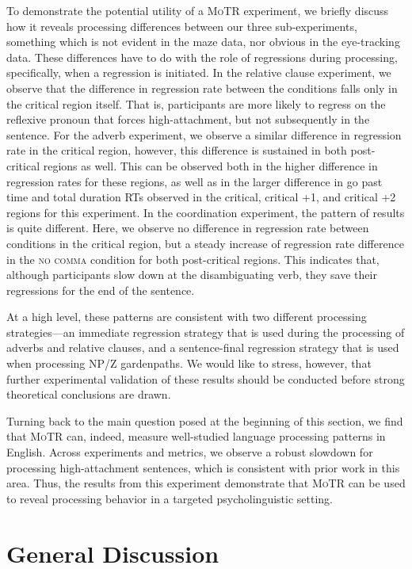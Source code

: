 \documentclass[12pt]{article}
\newcommand{\motr}{\textsc{MoTR}\xspace}
\newcommand{\nocomma}{\textsc{no comma}\xspace}
\begin{document}
{To demonstrate the potential utility of a \motr experiment, we briefly discuss how it reveals processing differences between our three sub-experiments, something which is not evident in the maze data, nor obvious in the eye-tracking data. These differences have to do with the role of regressions during processing, specifically, when a regression is initiated. In the relative clause experiment, we observe that the difference in regression rate between the conditions falls only in the critical region itself. That is, participants are more likely to regress on the reflexive pronoun that forces high-attachment, but not subsequently in the sentence. For the adverb experiment, we observe a similar difference in regression rate in the critical region, however, this difference is sustained in both post-critical regions as well. This can be observed both in the higher difference in regression rates for these regions, as well as in the larger difference in go past time and total duration RTs observed in the critical, critical +1, and critical +2 regions for this experiment. In the coordination experiment, the pattern of results is quite different. Here, we observe no difference in regression rate between conditions in the critical region, but a steady increase of regression rate difference in the \nocomma condition for both post-critical regions. This indicates that, although participants slow down at the disambiguating verb, they save their regressions for the end of the sentence. 

At a high level, these patterns are consistent with two different processing strategies---an immediate regression strategy that is used during the processing of adverbs and relative clauses, and a sentence-final regression strategy that is used when processing NP/Z gardenpaths. We would like to stress, however, that further experimental validation of these results should be conducted before strong theoretical conclusions are drawn.

Turning back to the main question posed at the beginning of this section, we find that \motr can, indeed, measure well-studied language processing patterns in English. Across experiments and metrics, we observe a robust slowdown for processing high-attachment sentences, which is consistent with prior work in this area. Thus, the results from this experiment demonstrate that \motr can be used to reveal processing behavior in a targeted psycholinguistic setting.


\section{General Discussion}


}
\end{document}
